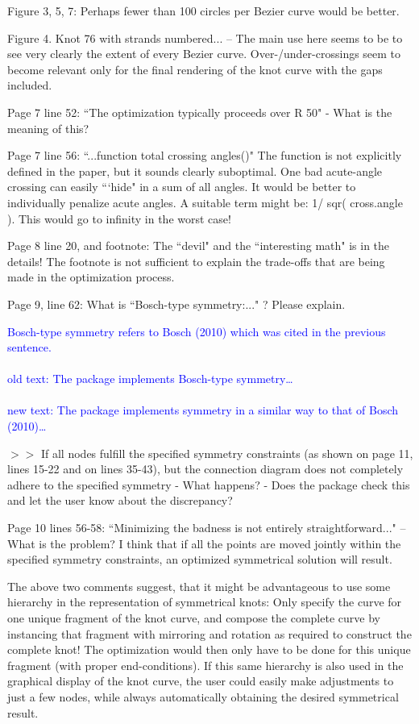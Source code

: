 \documentclass[12pt]{article}
\begin{document}
Figure 3, 5, 7: Perhaps fewer than 100 circles per Bezier curve would
be better.


Figure 4.  Knot 76 with strands numbered... -- The main use here seems
to be to see very clearly the extent of every Bezier curve.
Over-/under-crossings seem to become relevant only for the final
rendering of the knot curve with the gaps included.

Page 7 line 52: ``The optimization typically proceeds over R 50" - What
is the meaning of this?

Page 7 line 56: ``...function total crossing angles()" The function is
not explicitly defined in the paper, but it sounds clearly suboptimal.
One bad acute-angle crossing can easily ```hide" in a sum of all angles.
It would be better to individually penalize acute angles.  A suitable
term might be: 1/ sqr( cross.angle ).  This would go to infinity in
the worst case!

Page 8 line 20, and footnote: The ``devil" and the ``interesting math"
is in the details!  The footnote is not sufficient to explain the
trade-offs that are being made in the optimization process.

Page 9, line 62: What is ``Bosch-type symmetry:..." ?  Please explain.


\textcolor{blue}{Bosch-type symmetry refers to Bosch (2010) which was
  cited in the previous sentence.\\ \\ old text: The package
  implements Bosch-type symmetry\ldots \\ \\ new text: The package
  implements symmetry in a similar way to that of Bosch (2010)\ldots}
  
$>>$ If all nodes fulfill the specified symmetry constraints (as shown
on page 11, lines 15-22 and on lines 35-43), but the connection
diagram does not completely adhere to the specified symmetry - What
happens? - Does the package check this and let the user know about the
discrepancy?

Page 10 lines 56-58: ``Minimizing the badness is not entirely
straightforward..."  -- What is the problem?  I think that if all the
points are moved jointly within the specified symmetry constraints, an
optimized symmetrical solution will result.

{The above two comments suggest, that it might be advantageous to use
  some hierarchy in the representation of symmetrical knots: Only
  specify the curve for one unique fragment of the knot curve, and
  compose the complete curve by instancing that fragment with
  mirroring and rotation as required to construct the complete knot!
  The optimization would then only have to be done for this unique
  fragment (with proper end-conditions).  If this same hierarchy is
  also used in the graphical display of the knot curve, the user could
  easily make adjustments to just a few nodes, while always
  automatically obtaining the desired symmetrical result.}
\end{document}

